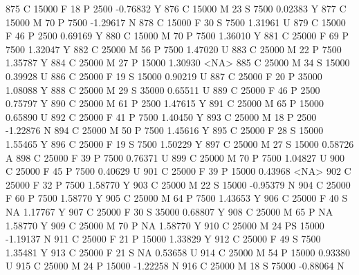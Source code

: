\documentclass{article}
\begin{document}
\begin{Schunk}
\begin{Soutput}
875       C      15000   F  18         P   2500  -0.76832    Y
876       C      15000   M  23         S   7500   0.02383    Y
877       C      15000   M  70         P   7500  -1.29617    N
878       C      15000   F  30         S   7500   1.31961    U
879       C      15000   F  46         P   2500   0.69169    Y
880       C      15000   M  70         P   7500   1.36010    Y
881       C      25000   F  69         P   7500   1.32047    Y
882       C      25000   M  56         P   7500   1.47020    U
883       C      25000   M  22         P   7500   1.35787    Y
884       C      25000   M  27         P  15000   1.30930 <NA>
885       C      25000   M  34         S  15000   0.39928    U
886       C      25000   F  19         S  15000   0.90219    U
887       C      25000   F  20         P  35000   1.08088    Y
888       C      25000   M  29         S  35000   0.65511    U
889       C      25000   F  46         P   2500   0.75797    Y
890       C      25000   M  61         P   2500   1.47615    Y
891       C      25000   M  65         P  15000   0.65890    U
892       C      25000   F  41         P   7500   1.40450    Y
893       C      25000   M  18         P   2500  -1.22876    N
894       C      25000   M  50         P   7500   1.45616    Y
895       C      25000   F  28         S  15000   1.55465    Y
896       C      25000   F  19         S   7500   1.50229    Y
897       C      25000   M  27         S  15000   0.58726    A
898       C      25000   F  39         P   7500   0.76371    U
899       C      25000   M  70         P   7500   1.04827    U
900       C      25000   F  45         P   7500   0.40629    U
901       C      25000   F  39         P  15000   0.43968 <NA>
902       C      25000   F  32         P   7500   1.58770    Y
903       C      25000   M  22         S  15000  -0.95379    N
904       C      25000   F  60         P   7500   1.58770    Y
905       C      25000   M  64         P   7500   1.43653    Y
906       C      25000   F  40         S     NA   1.17767    Y
907       C      25000   F  30         S  35000   0.68807    Y
908       C      25000   M  65         P     NA   1.58770    Y
909       C      25000   M  70         P     NA   1.58770    Y
910       C      25000   M  24        PS  15000  -1.19137    N
911       C      25000   F  21         P  15000   1.33829    Y
912       C      25000   F  49         S   7500   1.35481    Y
913       C      25000   F  21         S     NA   0.53658    U
914       C      25000   M  54         P  15000   0.93380    U
915       C      25000   M  24         P  15000  -1.22258    N
916       C      25000   M  18         S  75000  -0.88064    N

\end{Soutput}
\end{Schunk}
\end{document}
